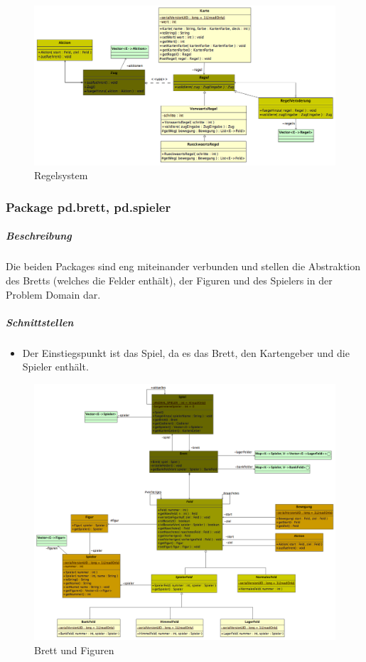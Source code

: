 \documentclass[12pt,halfparskip]{scrartcl}
\begin{document}
\begin{figure}[h]
	\centering
	\includegraphics[width=\textwidth]{pd_regelsystem}
	\caption{Regelsystem}
	\label{fig:pd_regelsystem}
\end{figure}


\clearpage
\subsubsection{Package pd.brett, pd.spieler} %
\label{ssub:package_pd_brett}
\subparagraph{Beschreibung}
Die beiden Packages sind eng miteinander verbunden und stellen die Abstraktion des Bretts (welches die Felder enthält), der Figuren und des Spielers in der Problem Domain dar.

\subparagraph{Schnittstellen}
\begin{itemize}
	\item Der Einstiegspunkt ist das Spiel, da es das Brett, den Kartengeber und die Spieler enthält.
\end{itemize}

\label{ssub:diagramme}
\begin{figure}[h]
	\centering
	\includegraphics[width=\textwidth]{pd_brett}
	\caption{Brett und Figuren}
	\label{fig:pd_brett}
\end{figure}
\end{document}

